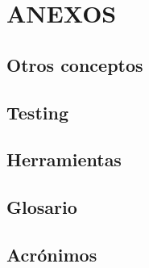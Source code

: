 \documentclass[12pt]{report}
\begin{document}

\appendix

\part*{ANEXOS}

\chapter{Otros conceptos}\label{A}


\chapter{Testing}


\chapter{Herramientas}


\chapter{Glosario}


\chapter{Acrónimos}


\end{document}

